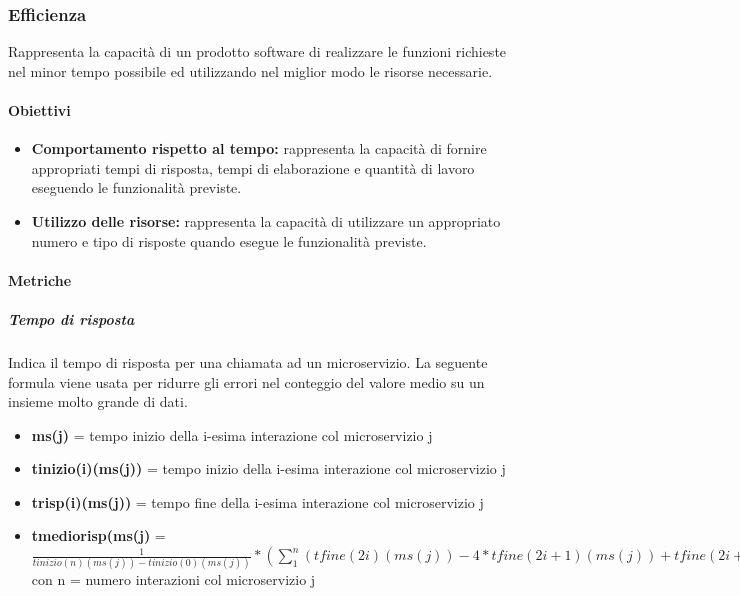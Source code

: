 			
			
			
	
	\subsubsection{Efficienza}
	Rappresenta la capacità di un prodotto software di realizzare le funzioni richieste nel minor tempo possibile ed utilizzando nel miglior modo le risorse necessarie.
		
		\paragraph{Obiettivi}
			\begin{itemize}
				\item \textbf{Comportamento rispetto al tempo:} rappresenta la capacità di fornire appropriati tempi di risposta, tempi di elaborazione e quantità di lavoro eseguendo le funzionalità previste.
				\item \textbf{Utilizzo delle risorse:} rappresenta la capacità di utilizzare un appropriato numero e tipo di risposte quando esegue le funzionalità previste.
			\end{itemize}
		
		\paragraph{Metriche}
			\subparagraph{Tempo di risposta}
			Indica il tempo di risposta per una chiamata ad un microservizio. La seguente formula viene usata per ridurre gli errori nel conteggio del valore medio su un insieme molto grande di dati.
			
			\begin{itemize}
				\item \textbf{ms(j)} = tempo inizio della i-esima interazione col microservizio j
				\item \textbf{tinizio(i)(ms(j))} = tempo inizio della i-esima interazione col microservizio j
				\item \textbf{trisp(i)(ms(j))} = tempo fine della i-esima interazione col microservizio j
				\item \textbf{tmediorisp(ms(j)} = \begin{math}
				\frac{1}{tinizio(n)(ms(j))-tinizio(0)(ms(j))}*(\sum_{1}^{n}(tfine(2i)(ms(j)) - 4*tfine(2i+1)(ms(j)) + tfine(2i+2)(ms(j)))) 
				\end{math} con n = numero interazioni col microservizio j
			\end{itemize}
			
